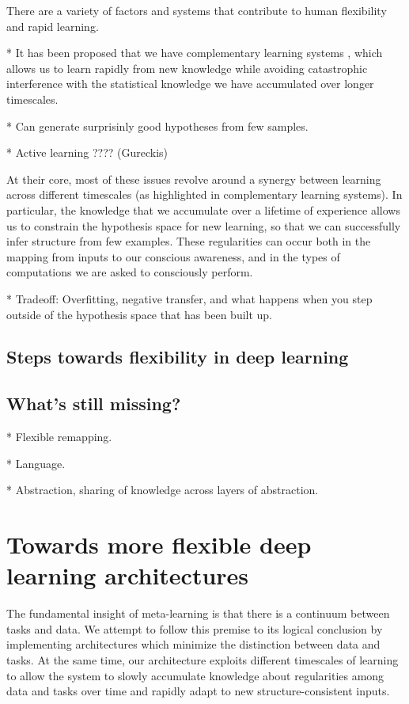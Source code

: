 \documentclass[10pt]{article}
\begin{document}
There are a variety of factors and systems that contribute to human flexibility and rapid learning. 

* It has been proposed that we have complementary learning systems \citep{McClelland1995, Kumaran2016}, which allows us to learn rapidly from new knowledge while avoiding catastrophic interference \citep{McCloskey1989} with the statistical knowledge we have accumulated over longer timescales.

* Can generate surprisinly good hypotheses from few samples. 

* Active learning ???? (Gureckis)

At their core, most of these issues revolve around a synergy between learning across different timescales (as highlighted in complementary learning systems). In particular, the knowledge that we accumulate over a lifetime of experience allows us to constrain the hypothesis space for new learning, so that we can successfully infer structure from few examples. These regularities can occur both in the mapping from inputs to our conscious awareness, and in the types of computations we are asked to consciously perform.  

* Tradeoff: Overfitting, negative transfer, and what happens when you step outside of the hypothesis space that has been built up.

\subsection{Steps towards flexibility in deep learning}

\subsection{What's still missing?}

* Flexible remapping.

* Language.

* Abstraction, sharing of knowledge across layers of abstraction.

\section{Towards more flexible deep learning architectures}

The fundamental insight of meta-learning is that there is a continuum between tasks and data. We attempt to follow this premise to its logical conclusion by implementing architectures which minimize the distinction between data and tasks. At the same time, our architecture exploits different timescales of learning to allow the system to slowly accumulate knowledge about regularities among data and tasks over time and rapidly adapt to new structure-consistent inputs.
\end{document}
